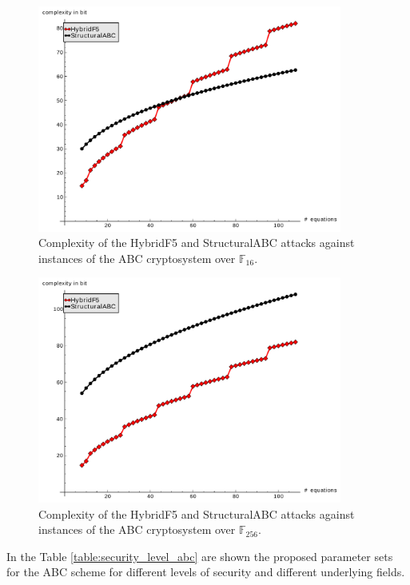 \begin{figure}
\centering
\includegraphics[width=10cm]{figures/hybridF5_structural_vs_m_gf16.pdf}
\caption{Complexity of the HybridF5 and StructuralABC attacks against instances of the ABC cryptosystem over $\mathbb{F}_{16}$.}
\label{fig:hybridF5_structural_gf16}
\end{figure}


\begin{figure}
\centering
\includegraphics[width=10cm]{figures/hybridF5_structural_vs_m_gf256.pdf}
\caption{Complexity of the HybridF5 and StructuralABC attacks against instances of the ABC cryptosystem over $\mathbb{F}_{256}$.}
\label{fig:hybridF5_structural_gf256}
\end{figure}
In the Table \ref{table:security_level_abc} are shown the proposed parameter sets for the ABC scheme for different levels of security and different underlying fields.

